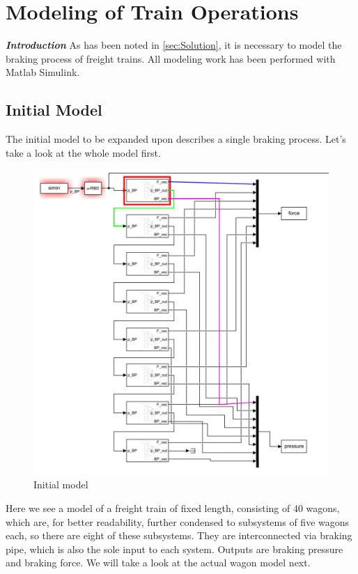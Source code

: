 \chapter{Modeling of Train Operations}
\label{chap:ModelingOfTrainOperations}
\par\noindent
\emph{\textbf{Introduction}} As has been noted in \ref{sec:Solution}, it is necessary to model the braking process of freight trains. All modeling work has been performed with Matlab Simulink. 

\section{Initial Model}
\label{sec:InitialModel}
\par\noindent
The initial model to be expanded upon describes a single braking process. Let's take a look at the whole model first. 

\begin{figure}[H]
	\centering
	\includegraphics[width=\linewidth]{./pic/initmodel_whole}
	\caption{Initial model}
	\label{fig:initmodel_whole}
\end{figure}

\par\noindent
Here we see a model of a freight train of fixed length, consisting of 40 wagons, which are, for better readability, further condensed to subsystems of five wagons each, so there are eight of these subsystems. They are interconnected via braking pipe, which is also the sole input to each system. Outputs are braking pressure and braking force. We will take a look at the actual wagon model next.

